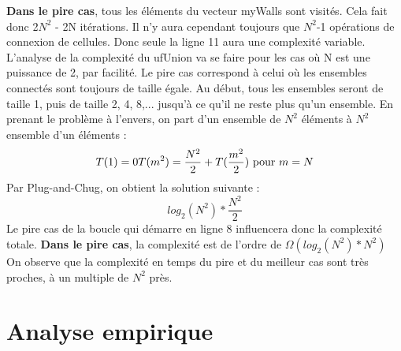 \documentclass[11pt]{article}
\begin{document}
\begin{description}
\textbf{Dans le pire cas}, tous les éléments du vecteur myWalls sont visités. Cela fait donc 2$N^{2}$ - 2N  itérations. Il n'y aura cependant toujours que $N^{2}$-1 opérations de connexion de cellules. Donc seule la ligne 11 aura une complexité variable. L'analyse de la complexité du ufUnion va se faire pour les cas où N est une puissance de 2, par facilité. Le pire cas correspond à celui où les ensembles connectés sont toujours de taille égale. Au début, tous les ensembles seront de taille 1, puis de taille 2, 4, 8,... jusqu'à ce qu'il ne reste plus qu'un ensemble. En prenant le problème à l'envers, on part d'un ensemble de $N^{2}$ éléments à $N^{2}$ ensemble d'un éléments :
\begin{equation}
	T(1) = 0
	T(m^{2}) = \frac{N^{2}}{2} + T(\frac{m^{2}}{2}) $ pour $ m = N
\end{equation}
Par Plug-and-Chug, on obtient la solution suivante :
\begin{equation}
	log_{2} (N^{2}) * \frac{N^{2}}{2}
\end{equation}
Le pire cas de la boucle qui démarre en ligne 8 influencera donc la complexité totale.
\textbf{Dans le pire cas}, la complexité est de l'ordre de $\Omega(log_{2} (N^{2})*N^{2})$
On observe que la complexité en temps du pire et du meilleur cas sont très proches, à un multiple de $N^{2}$ près.
\end{description}
\newpage 
\section{Analyse empirique}
\end{document}
